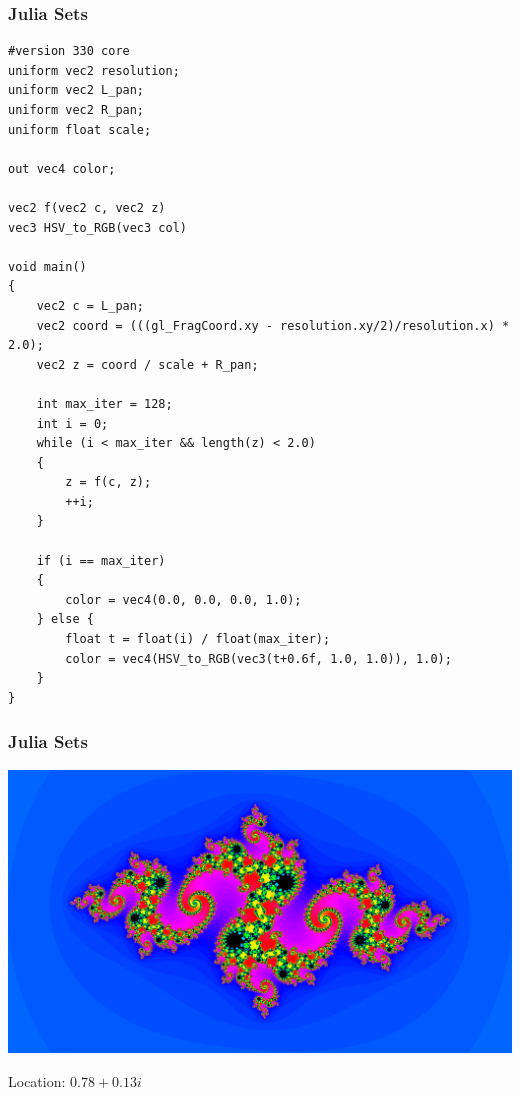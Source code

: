 \documentclass{beamer}
\begin{document}
\begin{frame}[fragile]
\frametitle{Julia Sets}

\begin{verbatim}
#version 330 core
uniform vec2 resolution;
uniform vec2 L_pan;
uniform vec2 R_pan;
uniform float scale;

out vec4 color;

vec2 f(vec2 c, vec2 z)
vec3 HSV_to_RGB(vec3 col)

void main()
{
    vec2 c = L_pan;
    vec2 coord = (((gl_FragCoord.xy - resolution.xy/2)/resolution.x) * 2.0);
    vec2 z = coord / scale + R_pan;

    int max_iter = 128;
    int i = 0;
    while (i < max_iter && length(z) < 2.0)
    {
        z = f(c, z);
        ++i;
    }

    if (i == max_iter)
    {
        color = vec4(0.0, 0.0, 0.0, 1.0);
    } else {
        float t = float(i) / float(max_iter);
        color = vec4(HSV_to_RGB(vec3(t+0.6f, 1.0, 1.0)), 1.0);
    }
}

\end{verbatim}
\end{frame}


\begin{frame}
\frametitle{Julia Sets}
\includegraphics[width=1.0\textwidth]{Julia.png}
\par \tiny {Location: $0.78 + 0.13i$}
\end{frame}
\end{document}

